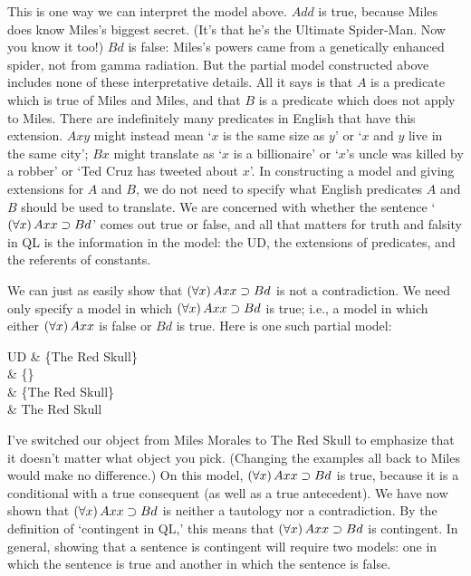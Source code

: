 This is one way we can interpret the model above. $Add$ is true, because Miles does know Miles's biggest secret. (It's that he's the Ultimate Spider-Man. Now you know it too!) $Bd$ is false: Miles's powers came from a genetically enhanced spider, not from gamma radiation. But the partial model constructed above includes none of these interpretative details. All it says is that $A$ is a predicate which is true of Miles and Miles, and that $B$ is a predicate which does not apply to Miles. There are indefinitely many predicates in English that have this extension. $Axy$ might instead mean `$x$ is the same size as $y$' or `$x$ and $y$ live in the same city'; $Bx$ might  translate as `$x$ is a billionaire' or `$x$'s uncle was killed by a robber' or `Ted Cruz has tweeted about $x$'. In constructing a model and giving extensions for $A$ and $B$, we do not need to specify what English predicates $A$ and $B$ should be used to translate. We are concerned with whether the sentence `$(\forall x) \,Axx \supset Bd$' comes out true or false, and all that matters for truth and falsity in QL is the information in the model: the UD, the extensions of predicates, and the referents of constants.

We can just as easily show that $(\forall x) \,Axx \supset Bd$ is not a contradiction. We need only specify a model in which $(\forall x) \,Axx \supset Bd$ is true; i.e., a model in which either $(\forall x) \, Axx$ is false or $Bd$ is true. Here is one such partial model:

\begin{partialmodel}
	UD			& \{The Red Skull\}\\
	 	& \{\}\\
		& \{The Red Skull\}\\
		& The Red Skull
\end{partialmodel}

I've switched our object from Miles Morales to The Red Skull to emphasize that it doesn't matter what object you pick. (Changing the examples all back to Miles would make no difference.) On this model, $(\forall x) \,Axx \supset Bd$ is true, because it is a conditional with a true consequent (as well as a true antecedent). We have now shown that $(\forall x) \,Axx \supset Bd$ is neither a tautology nor a contradiction. By the definition of `contingent in QL,' this means that 
$(\forall x) \,Axx \supset Bd$ is contingent. In general, showing that a sentence is contingent will require two models: one in which the sentence is true and another in which the sentence is false.


